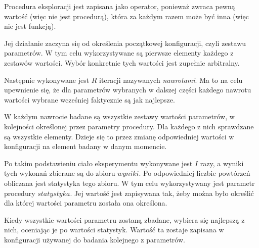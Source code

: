 \documentclass[./FM_mgr.tex]{subfiles}
\begin{document}
Procedura eksploracji jest zapisana jako operator, ponieważ zwraca pewną wartość (więc nie jest procedurą), która za każdym razem może być inna (więc nie jest funkcją).

Jej działanie zaczyna się od określenia początkowej konfiguracji, czyli zestawu parametrów. 
W tym celu wykorzystywane są pierwsze elementy każdego z zestawów wartości.
Wybór konkretnie tych wartości jest zupełnie arbitralny.

Następnie wykonywane jest $R$ iteracji nazywanych \emph{nawrotami}.
Ma to na celu upewnienie się, że dla parametrów wybranych w dalszej części każdego nawrotu wartości wybrane wcześniej faktycznie są jak najlepsze.

W każdym nawrocie badane są wszystkie zestawy wartości parametrów, w kolejności określonej przez parametry procedury.
Dla każdego z nich sprawdzane są wszystkie elementy.
Dzieje się to przez zmianę odpowiedniej wartości w konfiguracji na element badany w danym momencie.

Po takim podstawieniu ciało eksperymentu wykonywane jest $I$ razy, a wyniki tych wykonań zbierane są do zbioru $wyniki$.
Po odpowiedniej liczbie powtórzeń obliczana jest statystyka tego zbioru.
W tym celu wykorzystywany jest parametr procedury $statystyka$.
Jej wartość jest zapisywana tak, żeby można było określić dla której wartości parametru została ona określona.

Kiedy wszystkie wartości parametru zostaną zbadane, wybiera się najlepszą z nich, oceniając je po wartości statystyk.
Wartość ta zostaje zapisana w konfiguracji używanej do badania kolejnego z parametrów.

\end{document}
